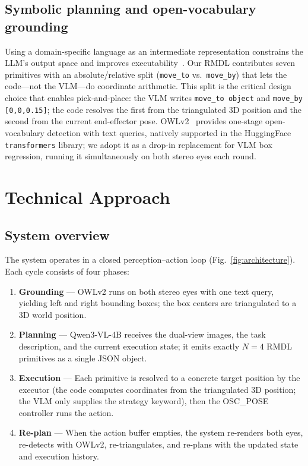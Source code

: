 \documentclass[conference]{IEEEtran}
\begin{document}
\subsection{Symbolic planning and open-vocabulary grounding}

Using a domain-specific language as an intermediate representation constrains the LLM's output space and improves executability~\cite{cap,saycan}. Our RMDL contributes seven primitives with an absolute/relative split (\texttt{move\_to} vs.\ \texttt{move\_by}) that lets the code---not the VLM---do coordinate arithmetic. This split is the critical design choice that enables pick-and-place: the VLM writes \texttt{move\_to\ object} and \texttt{move\_by [0,0,0.15]}; the code resolves the first from the triangulated 3D position and the second from the current end-effector pose. OWLv2~\cite{owlv2} provides one-stage open-vocabulary detection with text queries, natively supported in the HuggingFace \texttt{transformers} library; we adopt it as a drop-in replacement for VLM box regression, running it simultaneously on both stereo eyes each round.

\section{Technical Approach}
\label{sec:approach}

\subsection{System overview}
\label{sec:overview}

The system operates in a closed perception--action loop (Fig.~\ref{fig:architecture}). Each cycle consists of four phases:

\begin{enumerate}
    \item \textbf{Grounding} --- OWLv2 runs on both stereo eyes with one text query, yielding left and right bounding boxes; the box centers are triangulated to a 3D world position.
    \item \textbf{Planning} --- Qwen3-VL-4B receives the dual-view images, the task description, and the current execution state; it emits exactly $N=4$ RMDL primitives as a single JSON object.
    \item \textbf{Execution} --- Each primitive is resolved to a concrete target position by the executor (the code computes coordinates from the triangulated 3D position; the VLM only supplies the strategy keyword), then the OSC\_POSE controller runs the action.
    \item \textbf{Re-plan} --- When the action buffer empties, the system re-renders both eyes, re-detects with OWLv2, re-triangulates, and re-plans with the updated state and execution history.
\end{enumerate}
\end{document}
